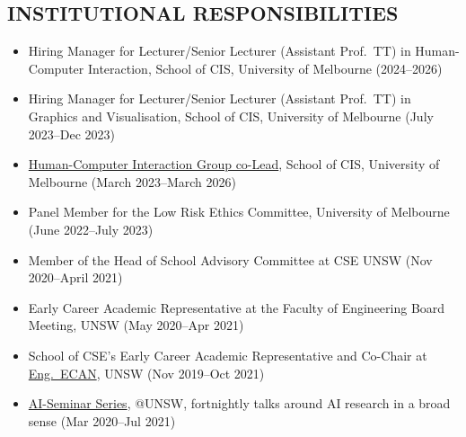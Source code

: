 
\subsection{INSTITUTIONAL RESPONSIBILITIES}
\vspace{2pt}

\begin{itemize}
    \item Hiring Manager for Lecturer/Senior Lecturer (Assistant Prof.\ TT) in Human-Computer Interaction, School of CIS, University of Melbourne \hfill (2024--2026)
    \item Hiring Manager for Lecturer/Senior Lecturer (Assistant Prof.\ TT) in Graphics and Visualisation, School of CIS, University of Melbourne \hfill (July 2023--Dec 2023)
    \item \href{https://cis.unimelb.edu.au/hci}{Human-Computer Interaction Group co-Lead}, School of CIS, University of Melbourne \hfill (March 2023--March 2026)
    \item Panel Member for the Low Risk Ethics Committee, University of Melbourne \hfill (June 2022--July 2023)
    \item Member of the Head of School Advisory Committee at CSE UNSW \hfill (Nov 2020--April 2021)
    \item Early Career Academic Representative at the Faculty of Engineering Board Meeting, UNSW \hfill (May 2020--Apr 2021)
    \item School of CSE's Early Career Academic Representative and Co-Chair at \href{https://research.unsw.edu.au/ecan-engineering}{Eng.\ ECAN}, UNSW \hfill (Nov 2019--Oct 2021)
    \item \href{https://ai-seminars.github.io/}{AI-Seminar Series}, @UNSW, fortnightly talks around AI research in a broad sense \hfill (Mar 2020--Jul 2021)
\end{itemize}
